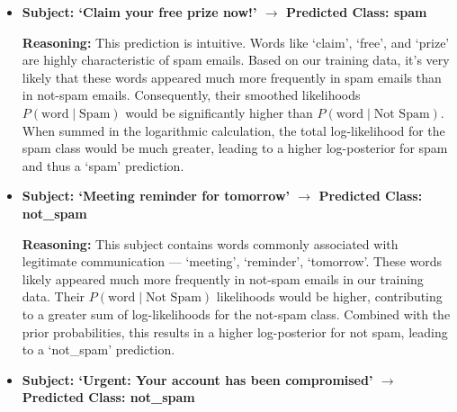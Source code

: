 \documentclass[12pt,letterpaper]{article}
\begin{document}
\begin{itemize}
    \item \textbf{Subject: `Claim your free prize now!' $\rightarrow$ Predicted Class: spam}
    
    \textbf{Reasoning:} This prediction is intuitive. Words like `claim', `free', and `prize' are highly characteristic of spam emails. Based on our training data, it's very likely that these words appeared much more frequently in spam emails than in not-spam emails. Consequently, their smoothed likelihoods $P(\text{word} \mid \text{Spam})$ would be significantly higher than $P(\text{word} \mid \text{Not Spam})$. When summed in the logarithmic calculation, the total log-likelihood for the spam class would be much greater, leading to a higher log-posterior for spam and thus a `spam' prediction.

    \item \textbf{Subject: `Meeting reminder for tomorrow' $\rightarrow$ Predicted Class: not\_spam}
    
    \textbf{Reasoning:} This subject contains words commonly associated with legitimate communication --- `meeting', `reminder', `tomorrow'. These words likely appeared much more frequently in not-spam emails in our training data. Their $P(\text{word} \mid \text{Not Spam})$ likelihoods would be higher, contributing to a greater sum of log-likelihoods for the not-spam class. Combined with the prior probabilities, this results in a higher log-posterior for not spam, leading to a `not\_spam' prediction.

    \item \textbf{Subject: `Urgent: Your account has been compromised' $\rightarrow$ Predicted Class: not\_spam}
    

\end{itemize}
\end{document}
